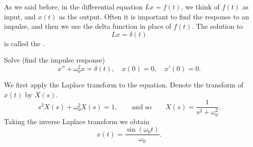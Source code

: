 \documentclass{ximera}
\begin{document}
As we said before, in the differential equation $L x = f(t)$, we think of $f(t)$ as input, and $x(t)$ as the output.  Often it is important to find the response to an impulse, and then we use the delta function in place of $f(t)$. The solution to
\begin{equation*}
    L x = \delta(t)
\end{equation*}
is called the \emph{}.

\begin{example}
    Solve (find the impulse response)
    \begin{equation} \label{eq:lteximpulseresp}
        x'' + \omega_0^2 x = \delta(t) , \quad x(0) = 0, \quad x'(0) = 0 .
    \end{equation}
\end{example}

\begin{exampleSol}
    We first apply the Laplace transform to the equation.  Denote the transform of $x(t)$ by $X(s)$.
    \begin{equation*}
        s^2 X(s) + \omega_0^2 X(s) = 1 , \qquad \text{and so} \qquad X(s) = \frac{1}{s^2+ \omega_0^2} .
    \end{equation*}
    Taking the inverse Laplace transform we obtain
    \begin{equation*}
        x(t) = \frac{\sin (\omega_0 t)}{\omega_0} .
    \end{equation*}
\end{exampleSol}
\end{document}
